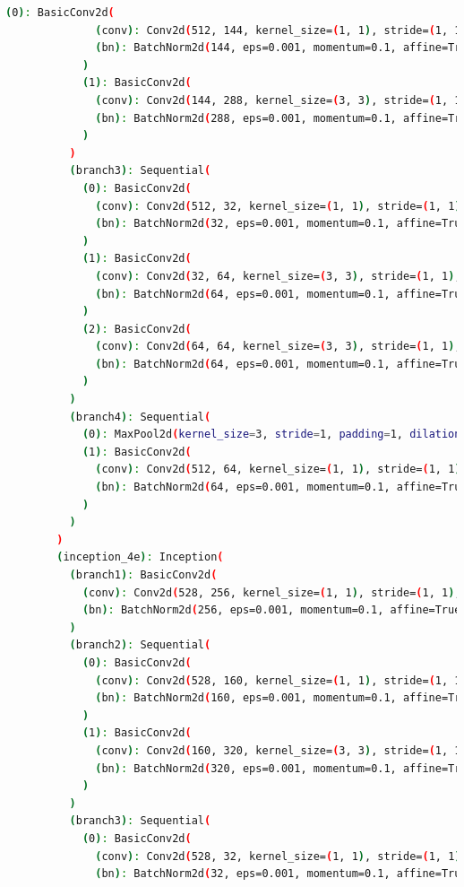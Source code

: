 \documentclass[a4paper, 12pt]{article}
\begin{document}
\begin{lstlisting}[language=sh]
            (0): BasicConv2d(
              (conv): Conv2d(512, 144, kernel_size=(1, 1), stride=(1, 1), bias=False)
              (bn): BatchNorm2d(144, eps=0.001, momentum=0.1, affine=True, track_running_stats=True)
            )
            (1): BasicConv2d(
              (conv): Conv2d(144, 288, kernel_size=(3, 3), stride=(1, 1), padding=(1, 1), bias=False)
              (bn): BatchNorm2d(288, eps=0.001, momentum=0.1, affine=True, track_running_stats=True)
            )
          )
          (branch3): Sequential(
            (0): BasicConv2d(
              (conv): Conv2d(512, 32, kernel_size=(1, 1), stride=(1, 1), bias=False)
              (bn): BatchNorm2d(32, eps=0.001, momentum=0.1, affine=True, track_running_stats=True)
            )
            (1): BasicConv2d(
              (conv): Conv2d(32, 64, kernel_size=(3, 3), stride=(1, 1), padding=(1, 1), bias=False)
              (bn): BatchNorm2d(64, eps=0.001, momentum=0.1, affine=True, track_running_stats=True)
            )
            (2): BasicConv2d(
              (conv): Conv2d(64, 64, kernel_size=(3, 3), stride=(1, 1), padding=(1, 1), bias=False)
              (bn): BatchNorm2d(64, eps=0.001, momentum=0.1, affine=True, track_running_stats=True)
            )
          )
          (branch4): Sequential(
            (0): MaxPool2d(kernel_size=3, stride=1, padding=1, dilation=1, ceil_mode=False)
            (1): BasicConv2d(
              (conv): Conv2d(512, 64, kernel_size=(1, 1), stride=(1, 1), bias=False)
              (bn): BatchNorm2d(64, eps=0.001, momentum=0.1, affine=True, track_running_stats=True)
            )
          )
        )
        (inception_4e): Inception(
          (branch1): BasicConv2d(
            (conv): Conv2d(528, 256, kernel_size=(1, 1), stride=(1, 1), bias=False)
            (bn): BatchNorm2d(256, eps=0.001, momentum=0.1, affine=True, track_running_stats=True)
          )
          (branch2): Sequential(
            (0): BasicConv2d(
              (conv): Conv2d(528, 160, kernel_size=(1, 1), stride=(1, 1), bias=False)
              (bn): BatchNorm2d(160, eps=0.001, momentum=0.1, affine=True, track_running_stats=True)
            )
            (1): BasicConv2d(
              (conv): Conv2d(160, 320, kernel_size=(3, 3), stride=(1, 1), padding=(1, 1), bias=False)
              (bn): BatchNorm2d(320, eps=0.001, momentum=0.1, affine=True, track_running_stats=True)
            )
          )
          (branch3): Sequential(
            (0): BasicConv2d(
              (conv): Conv2d(528, 32, kernel_size=(1, 1), stride=(1, 1), bias=False)
              (bn): BatchNorm2d(32, eps=0.001, momentum=0.1, affine=True, track_running_stats=True)

\end{lstlisting}
\end{document}
